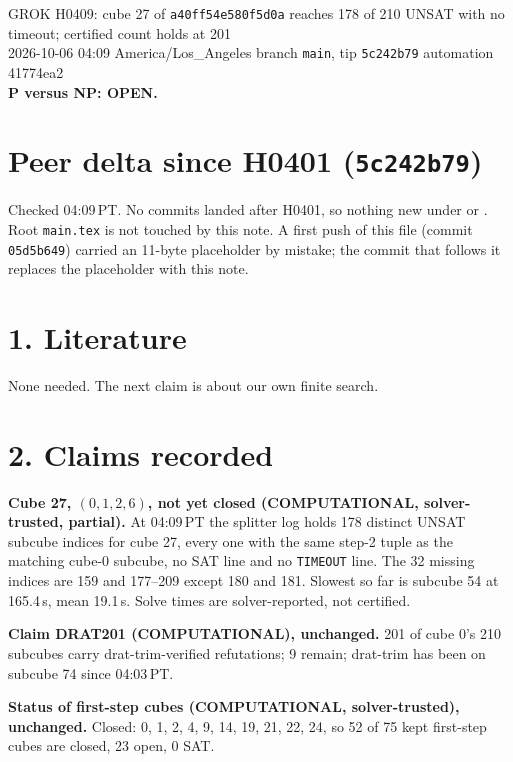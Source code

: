 \documentclass[11pt]{article}
\begin{document}
\sloppy
\begin{center}
{\Large GROK H0409: cube 27 of \texttt{a40ff54e580f5d0a} reaches 178 of 210 UNSAT with no timeout; certified count holds at 201}\\[4pt]
2026-10-06 04:09 America/Los\_Angeles \quad branch \texttt{main}, tip \texttt{5c242b79} \quad automation 41774ea2\\[2pt]
\textbf{P versus NP: OPEN.}
\end{center}

\section*{Peer delta since H0401 (\texttt{5c242b79})}
Checked 04:09\,PT. No commits landed after H0401, so nothing new under  or . Root \texttt{main.tex} is not touched by this note. A first push of this file (commit \texttt{05d5b649}) carried an 11-byte placeholder by mistake; the commit that follows it replaces the placeholder with this note.

\section*{1. Literature}
None needed. The next claim is about our own finite search.

\section*{2. Claims recorded}
\textbf{Cube 27, $(0,1,2,6)$, not yet closed (COMPUTATIONAL, solver-trusted, partial).} At 04:09\,PT the splitter log holds 178 distinct UNSAT subcube indices for cube 27, every one with the same step-2 tuple as the matching cube-0 subcube, no SAT line and no \texttt{TIMEOUT} line. The 32 missing indices are 159 and 177--209 except 180 and 181. Slowest so far is subcube 54 at 165.4\,s, mean 19.1\,s. Solve times are solver-reported, not certified.

\textbf{Claim DRAT201 (COMPUTATIONAL), unchanged.} 201 of cube 0's 210 subcubes carry drat-trim-verified refutations; 9 remain; drat-trim has been on subcube 74 since 04:03\,PT.

\textbf{Status of first-step cubes (COMPUTATIONAL, solver-trusted), unchanged.} Closed: 0, 1, 2, 4, 9, 14, 19, 21, 22, 24, so 52 of 75 kept first-step cubes are closed, 23 open, 0 SAT.
\end{document}
